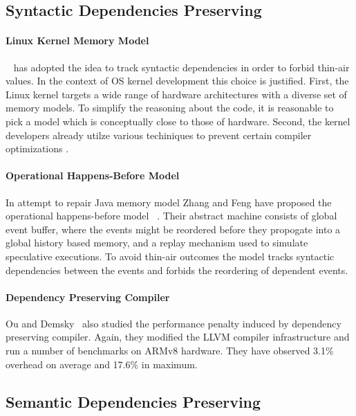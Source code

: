 \subsection{Syntactic Dependencies Preserving}
\label{sec:catalog:pporf}

\paragraph{Linux Kernel Memory Model}

\LKMM~\cite{Alglave-al:ASPLOS18} has adopted 
the idea to track syntactic dependencies in order to 
forbid thin-air values. In the context of OS kernel development 
this choice is justified. First, the Linux kernel targets 
a wide range of hardware architectures with a diverse
set of memory models. To simplify the reasoning about the code, 
it is reasonable to pick a model which is conceptually close
to those of hardware. Second, the kernel developers 
already utilze various techiniques to prevent 
certain compiler optimizations%
\cite{Alglave-al:ASPLOS18, LK-MemBarriers, LK-RCU-Deref}.

\paragraph{Operational Happens-Before Model}

In attempt to repair Java memory model Zhang and Feng have proposed the 
operational happens-before model \OHMM~\cite{Zhang-Feng:FCS16}.
Their abstract machine consists of global event buffer,
where the events might be reordered before they propogate into  
a global history based memory, and a replay mechanism 
used to simulate speculative executions. 
To avoid thin-air outcomes the model tracks syntactic dependencies 
between the events and forbids the reordering of dependent events. 

\paragraph{Dependency Preserving Compiler}

Ou and Demsky~\cite{Ou-Demsky:OOPSLA18} also studied 
the performance penalty induced by dependency preserving compiler. 
Again, they modified the LLVM compiler infrastructure 
and run a number of benchmarks on ARMv8 hardware. 
They have observed 3.1\% overhead on average and 17.6\% in maximum. 

\subsection{Semantic Dependencies Preserving}

